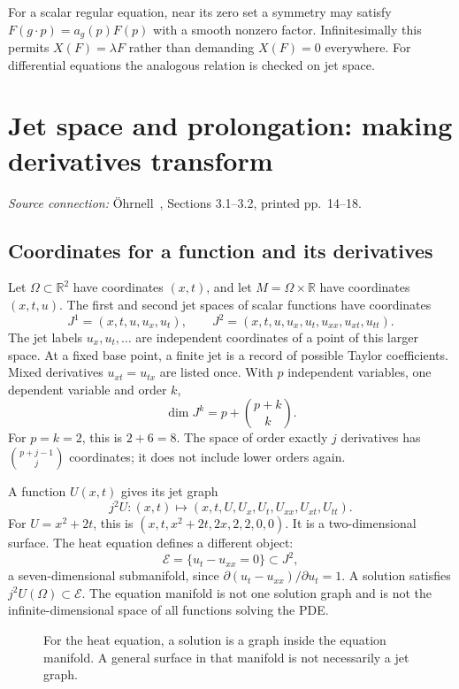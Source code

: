 \documentclass[11pt,a4paper]{article}
\numberwithin{equation}{section}
\theoremstyle{definition}
\theoremstyle{plain}
\theoremstyle{remark}
\newcommand{\R}{\mathbb R}
\newcommand{\source}[1]{\textit{Source connection:} \"Ohrnell~\cite{ohrnell}, #1.}
\begin{document}
For a scalar regular equation, near its zero set a symmetry may satisfy $F(g\cdot p)=a_g(p)F(p)$ with a smooth nonzero factor. Infinitesimally this permits $X(F)=\lambda F$ rather than demanding $X(F)=0$ everywhere. For differential equations the analogous relation is checked on jet space.

\section{Jet space and prolongation: making derivatives transform}\label{sec:jets}
\source{Sections 3.1--3.2, printed pp.~14--18}
\subsection{Coordinates for a function and its derivatives}
Let $\Omega\subset\R^2$ have coordinates $(x,t)$, and let $M=\Omega\times\R$ have coordinates $(x,t,u)$. The first and second jet spaces of scalar functions have coordinates
\[
J^1=(x,t,u,u_x,u_t),\qquad
J^2=(x,t,u,u_x,u_t,u_{xx},u_{xt},u_{tt}).
\]
The jet labels $u_x,u_t,\ldots$ are independent coordinates of a point of this larger space. At a fixed base point, a finite jet is a record of possible Taylor coefficients. Mixed derivatives $u_{xt}=u_{tx}$ are listed once. With $p$ independent variables, one dependent variable and order $k$,
\[
\dim J^k=p+\binom{p+k}{k}.
\]
For $p=k=2$, this is $2+6=8$. The space of order exactly $j$ derivatives has $\binom{p+j-1}{j}$ coordinates; it does not include lower orders again.

A function $U(x,t)$ gives its jet graph
\[
j^2U:(x,t)\longmapsto(x,t,U,U_x,U_t,U_{xx},U_{xt},U_{tt}).
\]
For $U=x^2+2t$, this is $(x,t,x^2+2t,2x,2,2,0,0)$. It is a two-dimensional surface. The heat equation defines a different object:
\[
\mathcal E=\{u_t-u_{xx}=0\}\subset J^2,
\]
a seven-dimensional submanifold, since $\partial(u_t-u_{xx})/\partial u_t=1$. A solution satisfies $j^2U(\Omega)\subset\mathcal E$. The equation manifold is not one solution graph and is not the infinite-dimensional space of all functions solving the PDE.

\begin{figure}[htbp]\centering
{}
\caption{For the heat equation, a solution is a graph inside the equation manifold. A general surface in that manifold is not necessarily a jet graph.}
\end{figure}
\end{document}
